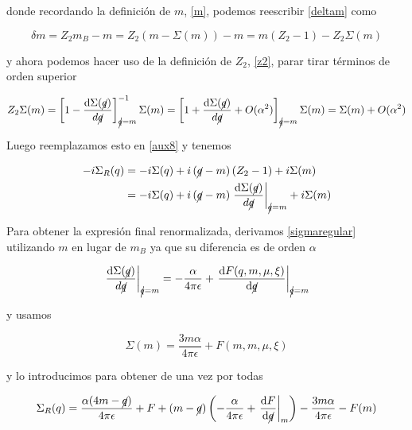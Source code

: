 \documentclass[tickz]{article}
\numberwithin{equation}{section}
\begin{document}
donde recordando la definición de $ m $, \ref{m}, podemos reescribir \ref{deltam} como

\begin{equation}\label{key}
\delta m = Z_2 m_B - m = Z_2 \left(m -\Sigma(m)\right) -m = m\left(Z_2 -1\right) - Z_2 \Sigma(m)
\end{equation}

y ahora podemos hacer uso de la definición de $ Z_2 $, \ref{z2}, parar tirar términos de orden superior

\begin{equation}\label{key}
Z_2 \Sigma(m) = \left[ 1 -\frac{\mathrm{d}\Sigma(\cancel{q})}{d\cancel{q}}\right]^{-1}_{\cancel{q}=m} \Sigma(m) = \left[ 1 +\frac{\mathrm{d}\Sigma(\cancel{q})}{d\cancel{q}} + O(\alpha^2)\right]_{\cancel{q}=m} \Sigma(m) = \Sigma(m) + O(\alpha^2)
\end{equation}

Luego reemplazamos esto en \ref{aux8} y tenemos

\begin{equation}\label{key}
\begin{aligned}
-i \Sigma_R(q) &= -i\Sigma(q) + i\left(\cancel{q} - m\right)\left(Z_2 -1\right) + i\Sigma(m)\\
&= -i\Sigma(q) + i\left(\cancel{q} - m\right)\left.\frac{\mathrm{d}\Sigma(\cancel{q})}{d\cancel{q}}\right|_{\cancel{q}=m} + i\Sigma(m)
\end{aligned}
\end{equation}

Para obtener la expresión final renormalizada, derivamos \ref{sigmaregular} utilizando $ m $ en lugar de $ m_B $ ya que su diferencia es de orden $ \alpha $

\begin{equation}\label{key}
\left.\frac{\mathrm{d}\Sigma(\cancel{q})}{d\cancel{q}}\right|_{\cancel{q}=m} = -\frac{\alpha}{4\pi \epsilon} + \left.\frac{\mathrm{d}F(q,m,\mu,\xi)}{\mathrm{d}\cancel{q}}\right|_{\cancel{q}=m}
\end{equation}

y usamos

\begin{equation}\label{key}
\Sigma(m) =  \frac{3m \alpha}{4\pi \epsilon} + F(m,m,\mu,\xi)
\end{equation}

y lo introducimos para obtener de una vez por todas

\begin{equation*}
\Sigma_R(q)= \frac{\alpha (4m -\cancel{q})}{4\pi \epsilon} + F + \left(m -\cancel{q}\right)\left( -\frac{\alpha}{4\pi \epsilon} + \left.\frac{\mathrm{d}F}{\mathrm{d}\cancel{q}}\right|_m \right) - \frac{3m\alpha}{4\pi\epsilon} - F(m)
\end{equation*}
\end{document}
